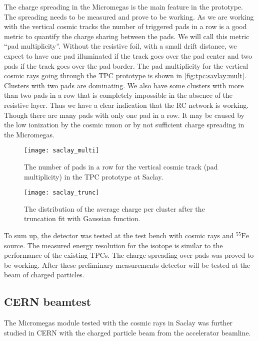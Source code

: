 \documentclass[../main.tex]{subfiles}
\begin{document}
The charge spreading in the Micromegas is the main feature in the prototype. The spreading needs to be measured and prove to be working. As we are working with the vertical cosmic tracks the number of triggered pads in a row is a good metric to quantify the charge sharing between the pads. We will call this metric ``pad multiplicity''. Without the resistive foil, with a small drift distance, we expect to have one pad illuminated if the track goes over the pad center and two pads if the track goes over the pad border. The pad multiplicity for the vertical cosmic rays going through the TPC prototype is shown in \autoref{fig:tpc:savlay:mult}. Clusters with two pads are dominating. We also have some clusters with more than two pads in a row that is completely impossible in the absence of the resistive layer. Thus we have a clear indication that the RC network is working. Though there are many pads with only one pad in a row. It may be caused by the low ionization by the cosmic muon or by not sufficient charge spreading in the Micromegas.

\begin{figure}[!ht]
  \centering
  \begin{minipage}{0.49\linewidth}
    \centering
    \texttt{[image: saclay\_multi]}
    \caption{The number of pads in a row for the vertical cosmic track (pad multiplicity) in the TPC prototype at Saclay.}
    \label{fig:tpc:savlay:mult}
  \end{minipage}
  \begin{minipage}{0.49\linewidth}
    \centering
    \texttt{[image: saclay\_trunc]}
    \caption{The distribution of the average charge per cluster after the truncation fit with Gaussian function.}
    \label{fig:tpc:saclay_charge}
  \end{minipage}
\end{figure}

To sum up, the detector was tested at the test bench with cosmic rays and ${}^{55}\text{Fe}$ source. The measured energy resolution for the isotope is similar to the performance of the existing TPCs. The charge spreading over pads was proved to be working. After these preliminary measurements detector will be tested at the beam of charged particles.

\subsection{CERN beamtest}
The Micromegas module tested with the cosmic rays in Saclay was further studied in CERN with the charged particle beam from the accelerator beamline.
\end{document}
